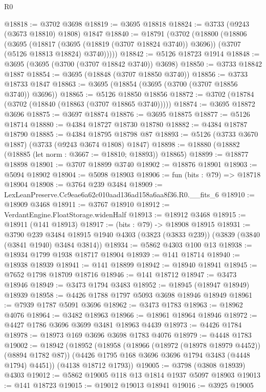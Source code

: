\begin{lexlean}{R0}
\begin{coremodule}
@18818 := @3702 @3698
@18819 := @3695 @18818
@18824 := @3733 (@9243 (@3673 @18810) @1808) @1847
@18840 := @18791
    (@3702
      (@18800
        (@18806
          (@3695
            (@18817 (@3695 (@18819 (@3707 @18824 @3740)) @3696))
            (@3707 (@5126 @18813 @18824) @3740)))))
@18842 := @5126 @18723 @1914
@18848 := @3695 (@3695 (@3700 (@3707 @18842 @3740)) @3698)
@18850 := @3733 @18842 @1887
@18854 := @3695 (@18848 (@3707 @18850 @3740))
@18856 := @3733 @18733 @1847
@18863 := @3695 (@18854 (@3695 (@3700 (@3707 @18856 @3740)) @3696))
@18865 := @5126 @18850 @18856
@18872 := @3702 (@18784 (@3702 (@18840 (@18863 (@3707 @18865 @3740)))))
@18874 := @3695 @18872 @3696
@18875 := @3697 @18874
@18876 := @3695 @18875
@18877 := @5126 @18714
@18880 := @4384 @18727 @18730 @18780
@18882 := @4384 @18787 @18790
@18885 := @4384 @18795 @18798 @87
@18893 := @5126 (@3733 @3670 @1887) (@3733 (@9243 @3674 @1808) @1847)
@18898 := @18880 (@18882 (@18885 (let norm : @3667 := @18810; @18893)) @18865)
@18899 := @18877 @18898
@18901 := @3707 @18899 @3740
@18902 := @18876 @18901
@18903 := @5094 @18902
@18904 := @5098 @18903
@18906 := fun (bits : @79) => @18718 @18904
@18908 := @3764 @239 @3484
@18909 := LexLeanPreserve.Cc9eae6a62c010aad136ad158a6aa8f36.R0.__fits_6
@18910 := @18909 @3468
@18911 := @3767 @18910
@18912 := VerdantEngine.FloatStorage.widenHalf
@18913 := @18912 @3468
@18915 := @18911 (@141 @18913)
@18917 := (bits : @79) -> @18908 @18915
@18931 := @3790
    @239
    @3484
    @18915
    @1940
    @4303
    (@3823 (@3833 @239))
    (@3839 (@3840 (@3841 @1940) @3484 @3814))
@18934 := @5862 @4303 @100 @13
@18938 := @18934 @1799 @1938 @18717 @18904
@18939 := @141 @18714
@18940 := @18938 @18939
@18941 := @141 @18899
@18942 := @18940 @18941
@18945 := @7652 @1798 @18709 @18716
@18946 := @141 @18712
@18947 := @3473 @18946
@18949 := @3473 @1794 @3483
@18952 := @18945 (@18947 @18949) @18939
@18958 := @4426 @1788 @1797 @5093 @3698 @18946 @18949
@18961 := @7939 @1787 @5091 @3696
@18962 := @3473 @1783
@18963 := @18962 @4076
@18964 := @3482 @18963
@18966 := @18961 @18964 @18946
@18972 := @4427 @1786 @3696 @3699 @3481 @18963 @4439
@18973 := @4426 @1784
@18978 := @18973 @169 @3696 @3698 @1783 @4076
@18979 := @4448 @1783
@19002 := @18942
    (@18952
      (@18958
        (@18966 (@18972 (@18978 @18979 @4452)) (@8894 @1782 @87))
        (@4426 @1795 @168 @3696 @3696 @1794 @3483 (@4448 @1794) @4451))
      (@4138 @18712 @1793))
@19005 := @3798 (@3808 @18939) @4303
@19012 := @5862 @19005 @118 @13 @1814 @1937 @5097 @18903
@19013 := @141 @18723
@19015 := @19012 @19013 @18941
@19016 := @3925 @19005

\end{coremodule}
\end{lexlean}
